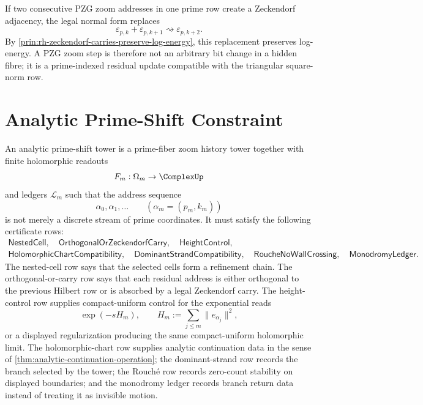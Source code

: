 \begin{principle}
\label{prin:rh-pzg-zoom-carry-preserves-triangular-energy}
If two consecutive PZG zoom addresses in one prime row create a
Zeckendorf adjacency, the legal normal form replaces
$$
\varepsilon_{p,k}+\varepsilon_{p,k+1}
\rightsquigarrow
\varepsilon_{p,k+2}.
$$
By \autoref{prin:rh-zeckendorf-carries-preserve-log-energy}, this
replacement preserves log-energy. A PZG zoom step is therefore not an
arbitrary bit change in a hidden fibre; it is a prime-indexed residual
update compatible with the triangular square-norm row.
\end{principle}

\section{Analytic Prime-Shift Constraint}
\label{sec:rh-analytic-prime-shift-constraint}

\begin{definition}
\label{def:rh-analytic-prime-shift-tower}
An analytic prime-shift tower is a prime-fiber zoom history tower
together with finite holomorphic readouts
$$
F_m:\Omega_m\to\ComplexUp
$$
and ledgers $\mathcal L_m$ such that the address sequence
$$
\alpha_0,\alpha_1,\ldots
\qquad
(\alpha_m=(p_m,k_m))
$$
is not merely a discrete stream of prime coordinates. It must satisfy
the following certificate rows:
$$
\begin{gathered}
\mathsf{NestedCell},\quad
\mathsf{OrthogonalOrZeckendorfCarry},\quad
\mathsf{HeightControl},\\
\mathsf{HolomorphicChartCompatibility},\quad
\mathsf{DominantStrandCompatibility},\quad
\mathsf{RoucheNoWallCrossing},\quad
\mathsf{MonodromyLedger}.
\end{gathered}
$$
The nested-cell row says that the selected cells form a refinement chain.
The orthogonal-or-carry row says that each residual address is either
orthogonal to the previous Hilbert row or is absorbed by a legal
Zeckendorf carry. The height-control row supplies compact-uniform
control for the exponential reads
$$
\exp(-sH_m),
\qquad
H_m:=\sum_{j\le m}\|e_{\alpha_j}\|^2,
$$
or a displayed regularization producing the same compact-uniform
holomorphic limit. The holomorphic-chart row supplies analytic
continuation data in the sense of
\autoref{thm:analytic-continuation-operation}; the dominant-strand row
records the branch selected by the tower; the Rouch\'e row records
zero-count stability on displayed boundaries; and the monodromy ledger
records branch return data instead of treating it as invisible motion.
\end{definition}


